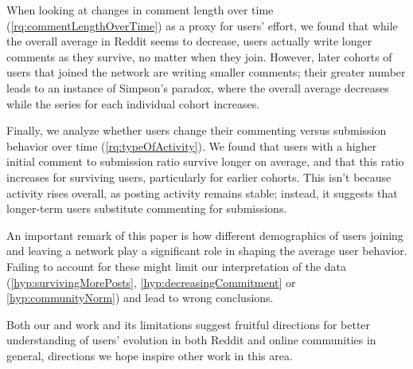 When looking at changes in comment length over time (\ref{rq:commentLengthOverTime}) as a proxy for users' effort, we found that while the overall average in Reddit seems to decrease, users actually write longer comments as they survive, no matter when they join.  However, later cohorts of users that joined the network are writing smaller comments; their greater number leads to an instance of Simpson's paradox, where the overall average decreases while the series for each individual cohort increases. 

Finally, we analyze whether users change their commenting versus submission behavior over time (\ref{rq:typeOfActivity}). 
We found that users with a higher initial comment to submission ratio survive longer on average, and that this ratio increases for surviving users, particularly for earlier cohorts.  This isn't because activity rises overall, as posting activity remains stable; instead, it suggests that longer-term users substitute commenting for submissions. 

An important remark of this paper is how different demographics of users joining and leaving a network play a significant role in shaping the average user behavior. Failing to account for these might limit our interpretation of the data (\ref{hyp:survivingMorePosts}, \ref{hyp:decreasingCommitment} or \ref{hyp:communityNorm}) and lead to wrong conclusions.

Both our and work and its limitations suggest fruitful directions for better understanding of users' evolution in both Reddit and online communities in general, directions we hope inspire other work in this area.  
